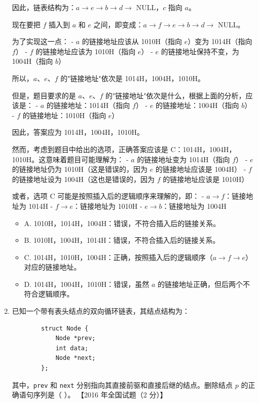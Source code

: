 \documentclass[lang=cn,newtx,10pt,scheme=chinese]{../../../elegantbook}
\begin{document}
\begin{enumerate}
        因此，链表结构为：$a \rightarrow e \rightarrow b \rightarrow d \rightarrow$ NULL，$c$ 指向 $a$。
        
        现在要把 $f$ 插入到 $a$ 和 $e$ 之间，即变成：$a \rightarrow f \rightarrow e \rightarrow b \rightarrow d \rightarrow$ NULL。
        
        为了实现这一点：
        - $a$ 的链接地址应该从 1010H（指向 $e$）变为 1014H（指向 $f$）
        - $f$ 的链接地址应该为 1010H（指向 $e$）
        - $e$ 的链接地址保持不变，为 1004H（指向 $b$）
        
        所以，$a$、$e$、$f$ 的"链接地址"依次是 1014H，1004H，1010H。

        但是，题目要求的是 $a$、$e$、$f$ 的"链接地址"依次是什么，根据上面的分析，应该是：
        - $a$ 的链接地址：1014H（指向 $f$）
        - $e$ 的链接地址：1004H（指向 $b$）
        - $f$ 的链接地址：1010H（指向 $e$）
        
        因此，答案应为 1014H，1004H，1010H。

        然而，考虑到题目中给出的选项，正确答案应该是 C：1014H，1004H，1010H。这意味着题目可能理解为：
        - $a$ 的链接地址变为 1014H（指向 $f$）
        - $e$ 的链接地址仍为 1010H（这是错误的，因为 $e$ 的链接地址应该是 1004H）
        - $f$ 的链接地址设为 1004H（这也是错误的，因为 $f$ 的链接地址应该是 1010H）
        
        或者，选项 C 可能是按照插入后的逻辑顺序来理解的，即：
        - $a \rightarrow f$：链接地址为 1014H
        - $f \rightarrow e$：链接地址为 1010H
        - $e \rightarrow b$：链接地址为 1004H

        \begin{itemize}
            \item A. 1010H，1014H，1004H：错误，不符合插入后的链接关系。
            \item B. 1010H，1004H，1014H：错误，不符合插入后的链接关系。
            \item C. 1014H，1010H，1004H：正确，按照插入后的逻辑顺序（$a \rightarrow f \rightarrow e$）对应的链接地址。
            \item D. 1014H，1004H，1010H：错误，虽然 $a$ 的链接地址正确，但后两个不符合逻辑顺序。
        \end{itemize}
    
        \item 已知一个带有表头结点的双向循环链表，其结点结构为：
        \begin{verbatim}
        struct Node {
            Node *prev;
            int data;
            Node *next;
        };
        \end{verbatim}
        其中，\texttt{prev} 和 \texttt{next} 分别指向其直接前驱和直接后继的结点。删除结点 $p$ 的正确语句序列是（ ）。  
        【2016 年全国试题（2 分）】  
    

\end{enumerate}
\end{document}
